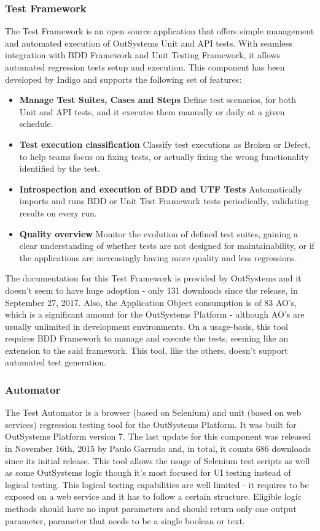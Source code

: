 \documentclass{sigchi}
\begin{document}
\subsubsection{Test Framework}
The Test Framework is an open source application that offers simple management and automated execution of OutSystems Unit and API tests. With seamless integration with BDD Framework and Unit Testing Framework, it allows automated regression tests setup and execution. This component has been developed by Indigo and supports the following set of features:
\begin{itemize}
	\item \textbf{Manage Test Suites, Cases and Steps} Define test scenarios, for both Unit and API tests, and it executes them manually or daily at a given schedule.
	\item \textbf{Test execution classification} Classify test executions as Broken or Defect, to help teams focus on fixing tests, or actually fixing the wrong functionality identified by the test.
	\item \textbf{Introspection and execution of BDD and UTF Tests} Automatically imports and runs BDD or Unit Test Framework tests periodically, validating results on every run.
	\item \textbf{Quality overview} Monitor the evolution of defined test suites, gaining a clear understanding of whether tests are not designed for maintainability, or if the applications are increasingly having more quality and less regressions.
\end{itemize}
The documentation for this Test Framework is provided by OutSystems and it doesn't seem to have huge adoption - only 131 downloads since the release, in September 27, 2017. Also, the Application Object consumption is of 83 AO's, which is a significant amount for the OutSystems Platform - although AO's are usually unlimited in development environments.
On a usage-basis, this tool requires BDD Framework to manage and execute the tests, seeming like an extension to the said framework. This tool, like the others, doesn't support automated test generation.

\subsubsection{Automator}
The Test Automator is a browser (based on Selenium) and unit (based on web services) regression testing tool for the OutSystems Platform. It was built for OutSystems Platform version 7. The last update for this component was released in November 16th, 2015 by Paulo Garrudo and, in total, it counts 686 downloads since its initial release.
This tool allows the usage of Selenium test scripts as well as some OutSystems logic though it's most focused for UI testing instead of logical testing. This logical testing capabilities are well limited - it requires to be exposed on a web service and it has to follow a certain structure. Eligible logic methods should have no input parameters and should return only one output parameter, parameter that needs to be a single boolean or text.
\end{document}
